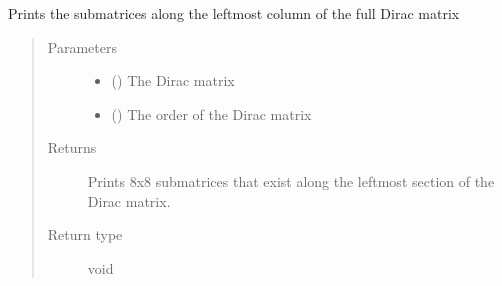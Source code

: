 \documentclass[letterpaper,10pt,english]{sphinxmanual}
\begin{document}
\begin{fulllineitems}
\label{\detokenize{index:su2.showMc}}
Prints the submatrices along the leftmost column of the full
Dirac matrix
\begin{quote}\begin{description}
\item[{Parameters}] \leavevmode\begin{itemize}
\item {} 
 () \textendash{} The Dirac matrix

\item {} 
 () \textendash{} The order of the Dirac matrix

\end{itemize}

\item[{Returns}] \leavevmode
Prints 8x8 submatrices that exist along the leftmost section of
the Dirac matrix.

\item[{Return type}] \leavevmode
void

\end{description}\end{quote}

\end{fulllineitems}

\end{document}
